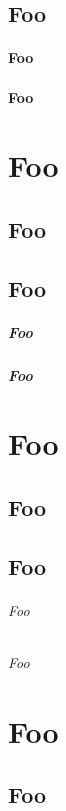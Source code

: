 \chapter{Foo}
\subsection{Foo}
\subsection{Foo}

\part{Foo}
\chapter{Foo}
\chapter{Foo}
\subsubsection{Foo}
\subsubsection{Foo}

\part{Foo}
\chapter{Foo}
\chapter{Foo}
\paragraph{Foo}
\paragraph{Foo}

\part{Foo}
\chapter{Foo}
